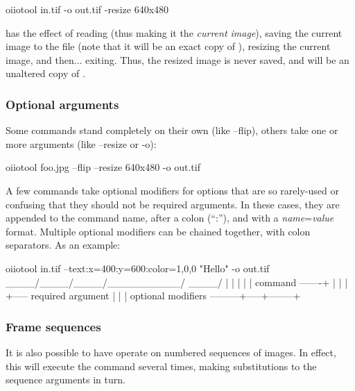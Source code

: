 \begin{code}
    oiiotool in.tif -o out.tif -resize 640x480
\end{code}

\noindent has the effect of reading  (thus making it the
\emph{current image}), saving the current image to the file 
(note that it will be an exact copy of ), resizing the current
image, and then... exiting. Thus, the resized image is never saved, and
 will be an unaltered copy of .

\subsubsection*{Optional arguments}
\label{sec:oiiotooloptionalargs}

Some commands stand completely on their own (like {\cf --flip}), others
take one or more arguments (like {\cf --resize} or {\cf -o}):

\smallskip
\hspace{0.25in} {\cf oiiotool foo.jpg --flip --resize 640x480 -o out.tif}
\smallskip

A few commands take optional modifiers for options that are so
rarely-used or confusing that they should not be required arguments.
In these cases, they are appended to the command name, after a colon
(``{\cf :}''), and with a \emph{name}{\cf =}\emph{value} format.  Multiple
optional modifiers can be chained together, with colon separators. As
an example:

\begin{code}
       oiiotool in.tif --text:x=400:y=600:color=1,0,0 "Hello" -o out.tif
                       \____/\____/\____/\__________/ \____/
                         |     |     |        |         |
          command -------+     |     |        |         +----- required argument
                               |     |        |
   optional modifiers ---------+-----+--------+
\end{code}

\subsubsection*{Frame sequences}

It is also possible to have \oiiotool operate on numbered sequences of
images.  In effect, this will execute the \oiiotool command several
times, making substitutions to the sequence arguments in turn.

